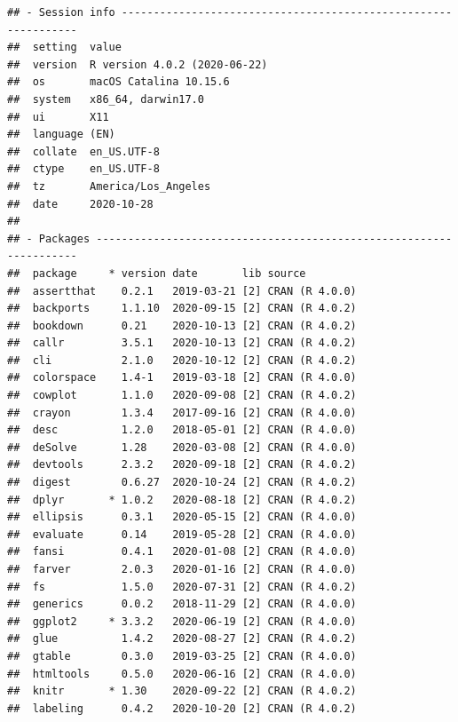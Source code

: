\documentclass[]{elsarticle} %
\begin{document}
\begin{verbatim}
## - Session info ---------------------------------------------------------------
##  setting  value                       
##  version  R version 4.0.2 (2020-06-22)
##  os       macOS Catalina 10.15.6      
##  system   x86_64, darwin17.0          
##  ui       X11                         
##  language (EN)                        
##  collate  en_US.UTF-8                 
##  ctype    en_US.UTF-8                 
##  tz       America/Los_Angeles         
##  date     2020-10-28                  
## 
## - Packages -------------------------------------------------------------------
##  package     * version date       lib source                            
##  assertthat    0.2.1   2019-03-21 [2] CRAN (R 4.0.0)                    
##  backports     1.1.10  2020-09-15 [2] CRAN (R 4.0.2)                    
##  bookdown      0.21    2020-10-13 [2] CRAN (R 4.0.2)                    
##  callr         3.5.1   2020-10-13 [2] CRAN (R 4.0.2)                    
##  cli           2.1.0   2020-10-12 [2] CRAN (R 4.0.2)                    
##  colorspace    1.4-1   2019-03-18 [2] CRAN (R 4.0.0)                    
##  cowplot       1.1.0   2020-09-08 [2] CRAN (R 4.0.2)                    
##  crayon        1.3.4   2017-09-16 [2] CRAN (R 4.0.0)                    
##  desc          1.2.0   2018-05-01 [2] CRAN (R 4.0.0)                    
##  deSolve       1.28    2020-03-08 [2] CRAN (R 4.0.0)                    
##  devtools      2.3.2   2020-09-18 [2] CRAN (R 4.0.2)                    
##  digest        0.6.27  2020-10-24 [2] CRAN (R 4.0.2)                    
##  dplyr       * 1.0.2   2020-08-18 [2] CRAN (R 4.0.2)                    
##  ellipsis      0.3.1   2020-05-15 [2] CRAN (R 4.0.0)                    
##  evaluate      0.14    2019-05-28 [2] CRAN (R 4.0.0)                    
##  fansi         0.4.1   2020-01-08 [2] CRAN (R 4.0.0)                    
##  farver        2.0.3   2020-01-16 [2] CRAN (R 4.0.0)                    
##  fs            1.5.0   2020-07-31 [2] CRAN (R 4.0.2)                    
##  generics      0.0.2   2018-11-29 [2] CRAN (R 4.0.0)                    
##  ggplot2     * 3.3.2   2020-06-19 [2] CRAN (R 4.0.0)                    
##  glue          1.4.2   2020-08-27 [2] CRAN (R 4.0.2)                    
##  gtable        0.3.0   2019-03-25 [2] CRAN (R 4.0.0)                    
##  htmltools     0.5.0   2020-06-16 [2] CRAN (R 4.0.0)                    
##  knitr       * 1.30    2020-09-22 [2] CRAN (R 4.0.2)                    
##  labeling      0.4.2   2020-10-20 [2] CRAN (R 4.0.2)                    

\end{verbatim}
\end{document}
